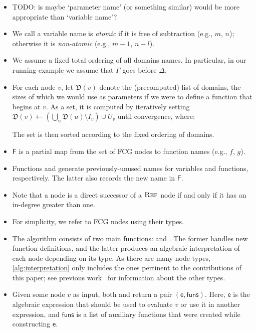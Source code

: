 \documentclass{article}
\theoremstyle{definition}
\theoremstyle{remark}
\DeclareMathOperator{\Reff}{\textsc{Ref}}
\begin{document}
\begin{itemize}
  \item TODO: is maybe `parameter name' (or something similar) would be more
        appropriate than `variable name'?
  \item We call a variable name is \emph{atomic} if it is free of subtraction
        (e.g., $m$, $n$); otherwise it is \emph{non-atomic} (e.g., $m-1$,
        $n-l$).
  \item We assume a fixed total ordering of all domains names. In particular, in
        our running example we assume that $\Gamma$ goes before $\Delta$.
  \item For each node $v$, let $\mathfrak{D}(v)$ denote the (precomputed) list
        of domains, the sizes of which we would use as parameters if we were to
        define a function that begins at $v$. As a set, it is computed by
        iteratively setting
        $\mathfrak{D}(v) \gets \left(\bigcup_{u} \mathfrak{D}(u) \setminus I_{v}\right) \cup U_{v}$
        until convergence, where:
        The set is then sorted according to the fixed ordering of domains.
  \item $\mathsf{F}$ is a partial map from the set of FCG nodes to function
        names (e.g., $f$, $g$).
  \item Functions \newVariableName and \newFunctionName generate
        previously-unused names for variables and functions, respectively. The
        latter also records the new name in $\mathsf{F}$.
  \item Note that a node is a direct successor of a $\Reff$ node if and only if
        it has an in-degree greater than one.
  \item For simplicity, we refer to FCG nodes using their types.
  \item The algorithm consists of two main functions: \visit and \actuallyVisit.
        The former handles new function definitions, and the latter produces an
        algebraic interpretation of each node depending on its type. As there
        are many node types, \cref{alg:interpretation} only includes the ones
        pertinent to the contributions of this paper; see previous
        work~\cite{DBLP:conf/ijcai/BroeckTMDR11} for information about the other
        types.
  \item Given some node $v$ as input, both \visit and \actuallyVisit return a
        pair $(\mathsf{e}, \mathsf{funs})$. Here, $\mathsf{e}$ is the algebraic
        expression that should be used to evaluate $v$ or use it in another
        expression, and $\mathsf{funs}$ is a list of auxiliary functions that
        were created while constructing $\mathsf{e}$.
\end{itemize}
\end{document}
